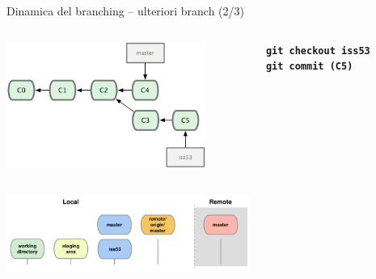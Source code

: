 \documentclass{beamer}
\begin{document}
\begin{frame}{\centerline{Dinamica del branching -- ulteriori branch (2/3)}}
  \begin{columns}
    \begin{column}{0.6\linewidth}
      \begin{center}
        \includegraphics[width=6.5cm]{A2023.LavoroCondiviso/18333fig0315-tn}
      \end{center}
    \end{column}
    \begin{column}{0.4\linewidth}
      \begin{center}
        \texttt{\textbf{git checkout iss53}}\\
        \texttt{\textbf{git commit (C5)}}
      \end{center}
    \end{column}
  \end{columns}
  \begin{center}
    \includegraphics[width=8cm]{A2023.LavoroCondiviso/git-checkout}
  \end{center}
\end{frame}
\end{document}
